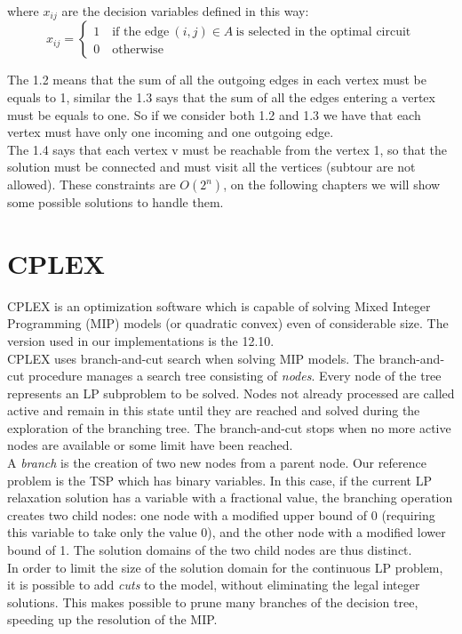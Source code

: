 where $x_{ij}$ are the decision variables defined in this way:
\[ x_{ij} =
	\begin{cases}
		1 \quad \text{if the edge} \ (i,j) \in A \ \text{is selected in the optimal circuit} \\
		0 \quad \text{otherwise}
	\end{cases}
\]

\noindent The 1.2 means that the sum of all the outgoing edges in each vertex must be equals to 1, similar the 1.3 says that the sum of all the edges entering a vertex must be equals to one. So if we consider both 1.2 and 1.3 we have that each vertex must have only one incoming and one outgoing edge. \\ The 1.4 says that each vertex v must be reachable from the vertex 1, so that the solution must be connected and must visit all the vertices (subtour are not allowed). These constraints are $O(2^n)$, on the following chapters we will show some possible solutions to handle them.


\section{CPLEX}
CPLEX is an optimization software which is capable of solving Mixed Integer Programming (MIP) models (or quadratic convex) even of considerable size. The version used in our implementations is the 12.10.\\
CPLEX uses branch-and-cut search when solving MIP models. The branch-and-cut procedure manages a search tree consisting of \textit{nodes}. Every node of the tree represents an LP subproblem to be solved. Nodes not already processed are called active and remain in this state until they are reached and solved during the exploration of the branching tree. The branch-and-cut stops when no more active nodes are available or some limit have been reached.\\
A \textit{branch} is the creation of two new nodes from a parent node. Our reference problem is the TSP which has binary variables. In this case, if the current LP relaxation solution has a variable with a fractional value, the branching operation creates two child nodes: one node with a modified upper bound of 0 (requiring this variable to take only the value 0), and the other node with a modified lower bound of 1. The solution domains of the two child nodes are thus distinct.\\
In order to limit the size of the solution domain for the continuous LP problem, it is possible to add \textit{cuts} to the model, without eliminating the legal integer solutions. This makes possible to prune many branches of the decision tree, speeding up the resolution of the MIP.

